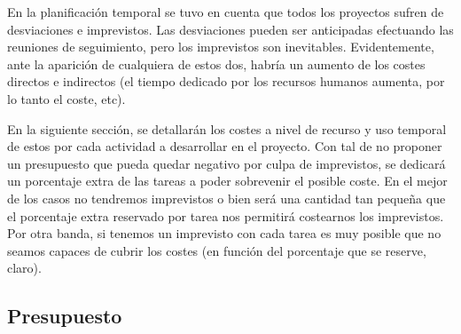 En la planificación temporal se tuvo en cuenta que todos los proyectos sufren de desviaciones e imprevistos. Las desviaciones pueden ser anticipadas efectuando las reuniones de seguimiento, pero los imprevistos son inevitables. Evidentemente, ante la aparición de cualquiera de estos dos, habría un aumento de los costes directos e indirectos (el tiempo dedicado por los recursos humanos aumenta, por lo tanto el coste, etc).
\par\medskip
En la siguiente sección, se detallarán los costes a nivel de recurso y uso temporal de estos por cada actividad a desarrollar en el proyecto. Con tal de no proponer un presupuesto que pueda quedar negativo por culpa de imprevistos, se dedicará un porcentaje extra de las tareas a poder sobrevenir el posible coste.
En el mejor de los casos no tendremos imprevistos o bien será una cantidad tan pequeña que el porcentaje extra reservado por tarea nos permitirá costearnos los imprevistos. Por otra banda, si tenemos un imprevisto con cada tarea es muy posible que no seamos capaces de cubrir los costes (en función del porcentaje que se reserve, claro).

\subsection{Presupuesto}

